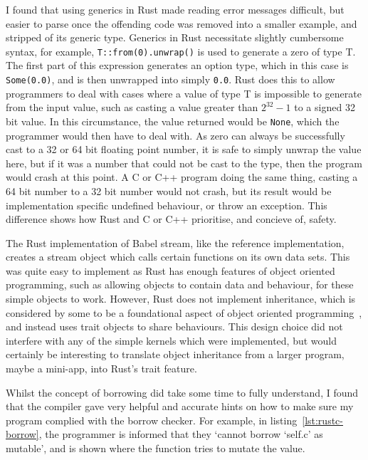 I found that using generics in Rust made reading error messages difficult, but easier to parse once the offending code was removed into a smaller example, and stripped of its generic type. Generics in Rust necessitate slightly cumbersome syntax, for example, \texttt{T::from(0).unwrap()} is used to generate a zero of type T. 
The first part of this expression generates an option type, which in this case is \texttt{Some(0.0)}, and is then unwrapped into simply \texttt{0.0}. Rust does this to allow programmers to deal with cases where a value of type T is impossible to generate from the input value, such as casting a value greater than $2^{32} - 1$ to a signed 32 bit value.
In this circumstance, the value returned would be \texttt{None}, which the programmer would then have to deal with. As zero can always be successfully cast to a 32 or 64 bit floating point number, it is safe to simply unwrap the value here, but if it was a number that could not be cast to the type, then the program would crash at this point. A C or C++ program doing the same thing, casting a 64 bit number to a 32 bit number would not crash, but its result would be implementation specific undefined behaviour, or throw an exception. This difference shows how Rust and C or C++ prioritise, and concieve of, safety.

The Rust implementation of Babel stream, like the reference implementation, creates a stream object which calls certain functions on its own data sets. This was quite easy to implement as Rust has enough features of object oriented programming, such as allowing objects to contain data and behaviour, for these simple objects to work.
However, Rust does not implement inheritance, which is considered by some to be a foundational aspect of object oriented programming~\cite{Liskov:1987}, and instead uses trait objects to share behaviours. This design choice did not interfere with any of the simple kernels which were implemented, but would certainly be interesting to translate object inheritance from a larger program, maybe a mini-app, into Rust's trait feature.

Whilst the concept of borrowing did take some time to fully understand, I found that the compiler gave very helpful and accurate hints on how to make sure my program complied with the borrow checker. For example, in listing~\ref{lst:rustc-borrow}, the programmer is informed that they `cannot borrow `self.c' as mutable', and is shown where the function tries to mutate the value. 

